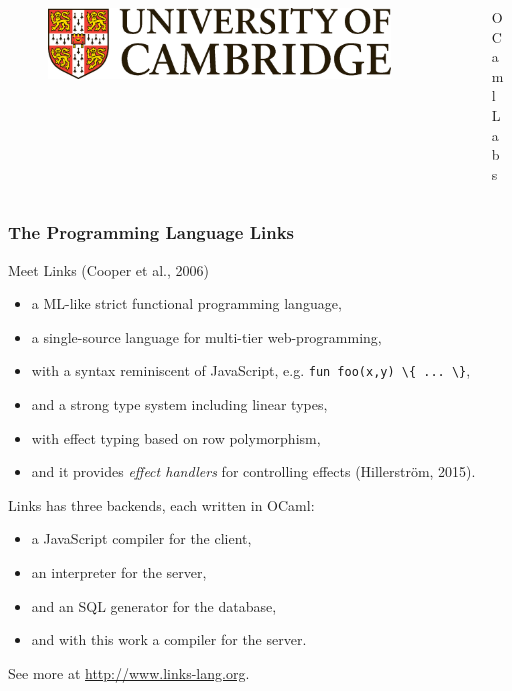 \documentclass[10pt,compress]{beamer}
\begin{document}
\begin{frame}[plain]
\vfill

\begin{columns}[T]
\begin{column}{0.5\textwidth}
\begin{figure}
\includegraphics[scale=0.18]{figures/cambridge.eps}
\end{figure}
\end{column}
\hfill
\begin{column}{0.5\textwidth}
\begin{figure}
OCaml Labs
\end{figure}
\end{column}
\end{columns}

\end{frame}

\begin{frame}[plain]
  \maketitle
\end{frame}

\begin{frame}
\frametitle{The Programming Language Links}
Meet Links (Cooper et al., 2006)
\begin{itemize}
  \item a ML-like strict functional programming language,
  \item a single-source language for multi-tier web-programming,
  \item with a syntax reminiscent of JavaScript, e.g. \lstinline$fun foo(x,y) \{ ... \}$,
  \item and a strong type system including linear types,
  \item with effect typing based on row polymorphism,
  \item and it provides \emph{effect handlers} for controlling effects (Hillerström, 2015).
\end{itemize}
Links has three backends, each written in OCaml:
\begin{itemize}
 \item a JavaScript compiler for the client,
 \item an interpreter for the server,
 \item and an SQL generator for the database,
 \item and with this work a compiler for the server.
\end{itemize}
See more at \url{http://www.links-lang.org}.
\end{frame}
\end{document}
